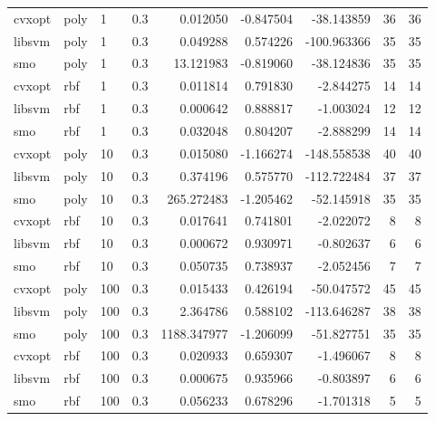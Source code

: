 \begin{tabular}{llllrrrrr}
cvxopt &   poly &   1 &     0.3 &    0.012050 & -0.847504 &  -38.143859 &           36 &         36 \\
libsvm &   poly &   1 &     0.3 &    0.049288 &  0.574226 & -100.963366 &           35 &         35 \\
   smo &   poly &   1 &     0.3 &   13.121983 & -0.819060 &  -38.124836 &           35 &         35 \\
cvxopt &    rbf &   1 &     0.3 &    0.011814 &  0.791830 &   -2.844275 &           14 &         14 \\
libsvm &    rbf &   1 &     0.3 &    0.000642 &  0.888817 &   -1.003024 &           12 &         12 \\
   smo &    rbf &   1 &     0.3 &    0.032048 &  0.804207 &   -2.888299 &           14 &         14 \\
cvxopt &   poly &  10 &     0.3 &    0.015080 & -1.166274 & -148.558538 &           40 &         40 \\
libsvm &   poly &  10 &     0.3 &    0.374196 &  0.575770 & -112.722484 &           37 &         37 \\
   smo &   poly &  10 &     0.3 &  265.272483 & -1.205462 &  -52.145918 &           35 &         35 \\
cvxopt &    rbf &  10 &     0.3 &    0.017641 &  0.741801 &   -2.022072 &            8 &          8 \\
libsvm &    rbf &  10 &     0.3 &    0.000672 &  0.930971 &   -0.802637 &            6 &          6 \\
   smo &    rbf &  10 &     0.3 &    0.050735 &  0.738937 &   -2.052456 &            7 &          7 \\
cvxopt &   poly & 100 &     0.3 &    0.015433 &  0.426194 &  -50.047572 &           45 &         45 \\
libsvm &   poly & 100 &     0.3 &    2.364786 &  0.588102 & -113.646287 &           38 &         38 \\
   smo &   poly & 100 &     0.3 & 1188.347977 & -1.206099 &  -51.827751 &           35 &         35 \\
cvxopt &    rbf & 100 &     0.3 &    0.020933 &  0.659307 &   -1.496067 &            8 &          8 \\
libsvm &    rbf & 100 &     0.3 &    0.000675 &  0.935966 &   -0.803897 &            6 &          6 \\
   smo &    rbf & 100 &     0.3 &    0.056233 &  0.678296 &   -1.701318 &            5 &          5 \\
\bottomrule
\end{tabular}
